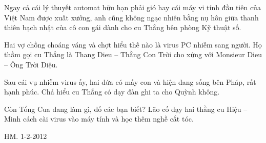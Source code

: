 Ngay cả cái lý thuyết automat hữu hạn phải gió hay cái máy vi tính đầu tiên của Việt Nam được xuất xưởng, anh cũng không ngạc nhiên bằng nụ hôn giữa thanh thiên bạch nhật của cô con gái  dành cho cu Thắng bên phòng Kỹ thuật số.

Hai vợ chồng choáng váng và chợt hiểu thế nào là virus PC nhiễm sang người. Họ thầm gọi cu Thắng là Thang Dieu – Thằng  Con Trời cho xứng với Monsieur Dieu – Ông Trời Diệu.

Sau cái vụ nhiễm virus ấy, hai đứa có mấy con và hiện đang sống bên Pháp, rất hạnh phúc. Chả hiểu cu Thắng có dạy đàn ghi ta cho Quỳnh không.

Còn Tổng Cua đang làm gì, đố các bạn biết? Lão cố dạy hai thằng cu Hiệu – Minh cách cài virus vào máy tính và học thêm nghề cắt tóc.

HM. 1-2-2012

